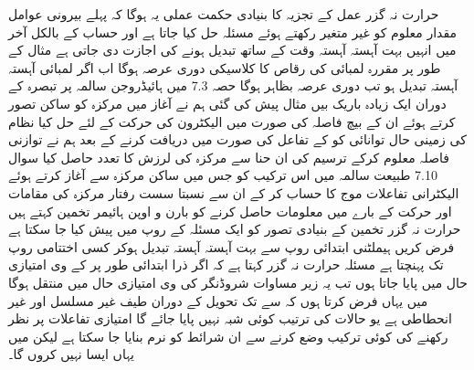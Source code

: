  حرارت نہ گزر عمل کے تجزیہ کا بنیادی حکمت عملی یہ ہوگا کہ پہلے بیرونی عوامل مقدار معلوم کو غیر متغیر رکھتے ہوئے مسئلہ حل کیا جاتا ہے اور حساب کے بالکل آخر میں انہیں بہت آہستہ آہستہ وقت کے ساتھ تبدیل ہونے کی اجازت دی جاتی ہے مثال کے طور پر مقررہ لمبائی  کی  رقاص  کا کلاسیکی دوری عرصہ  ہوگا اب اگر لمبائی آہستہ آہستہ تبدیل ہو تب دوری عرصہ  بظاہر   ہوگا حصہ 7.3 میں ہائیڈروجن سالمہ پر تبصرہ کے دوران ایک زیادہ باریک بیں مثال پیش کی گئی ہم نے آغاز میں مرکزہ کو ساکن تصور کرتے ہوئے ان کے بیچ فاصلہ  کی صورت میں الیکٹرون کی حرکت کے لئے حل کیا نظام کی زمینی حال توانائی کو  کے تفاعل کی صورت میں دریافت کرنے کے بعد ہم نے توازنی فاصلہ معلوم کرکے ترسیم کی ان حنا سے مرکزہ کی لرزش کا تعدد حاصل کیا سوال 7.10 طبیعت سالمہ میں اس ترکیب کو جس میں ساکن مرکزہ سے آغاز کرتے ہوئے الیکٹرانی تفاعلات موج کا حساب کر کے ان سے نسبتا سست رفتار مرکزہ کی مقامات اور حرکت کے بارے میں معلومات حاصل کرنے کو بارن و اوپن ہائيمر تخمین کہتے ہیں حرارت نہ گزر تخمین کے بنیادی تصور کو ایک مسئلہ کے روپ میں پیش کیا جا سکتا ہے فرض کریں ہيملٹنی ابتدائی روپ  سے بہت آہستہ آہستہ تبدیل ہوکر کسی اختتامی روپ   تک پہنچتا ہے مسئلہ حرارت نہ گزر کہتا ہے کہ اگر ذرا ابتدائی طور پر  کے  وی امتیازی حال میں پایا جاتا ہوں تب یہ زیر مساوات شروڈنگر  کی  وی امتیازی حال میں منتقل ہوگا میں یہاں فرض کرتا ہوں کہ  سے  تک تحویل کے دوران طیف غیر مسلسل اور غیر انحطاطی ہے یو حالات کی ترتیب کوئی شبہ نہیں پایا جائے گا امتیازی تفاعلات پر نظر رکھنے کی کوئی ترکیب وضع کرنے سے ان شرائط کو نرم بنایا جا سکتا ہے لیکن میں یہاں ایسا نہیں کروں گا۔
